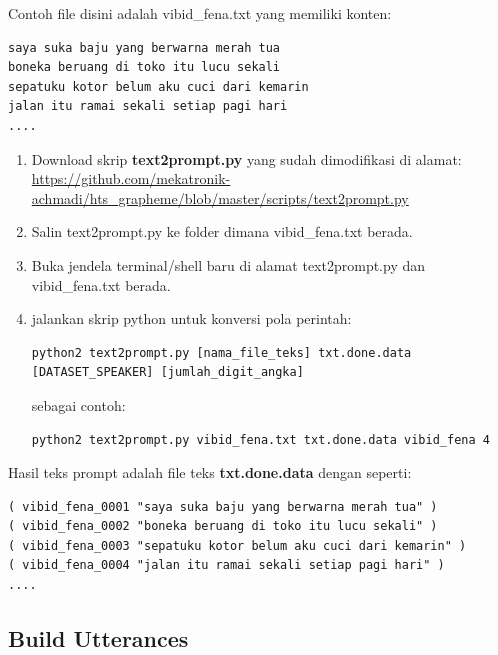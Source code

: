 \documentclass[12pt,]{article}
\begin{document}
	Contoh file disini adalah vibid\_fena.txt yang memiliki konten:
	\begin{verbatim}
saya suka baju yang berwarna merah tua
boneka beruang di toko itu lucu sekali
sepatuku kotor belum aku cuci dari kemarin
jalan itu ramai sekali setiap pagi hari
....
	\end{verbatim}
	
	\begin{enumerate}
		\item Download skrip \textbf{text2prompt.py} yang sudah dimodifikasi di alamat: \\
		\url{https://github.com/mekatronik-achmadi/hts_grapheme/blob/master/scripts/text2prompt.py}
		
		\item Salin text2prompt.py ke folder dimana vibid\_fena.txt berada.
		
		\item Buka jendela terminal/shell baru di alamat text2prompt.py dan vibid\_fena.txt berada.
		
		\item jalankan skrip python untuk konversi
		pola perintah:
		\begin{verbatim}
python2 text2prompt.py [nama_file_teks] txt.done.data [DATASET_SPEAKER] [jumlah_digit_angka]
		\end{verbatim}
		
		sebagai contoh:
		\begin{verbatim}
python2 text2prompt.py vibid_fena.txt txt.done.data vibid_fena 4
		\end{verbatim}
		
	\end{enumerate}

	Hasil teks prompt adalah file teks \textbf{txt.done.data} dengan seperti:
	\begin{verbatim}
( vibid_fena_0001 "saya suka baju yang berwarna merah tua" )
( vibid_fena_0002 "boneka beruang di toko itu lucu sekali" )
( vibid_fena_0003 "sepatuku kotor belum aku cuci dari kemarin" )
( vibid_fena_0004 "jalan itu ramai sekali setiap pagi hari" )
....
	\end{verbatim}

	\subsection{Build Utterances}
	
\end{document}
